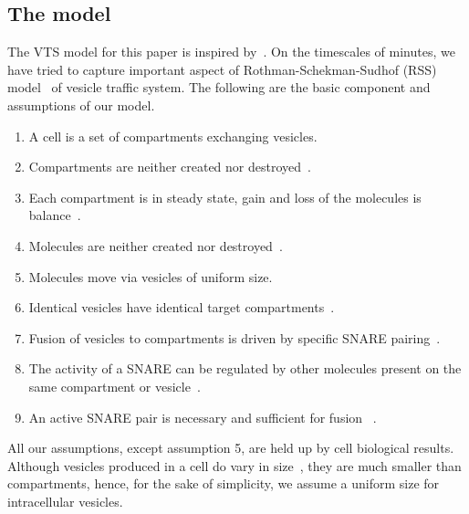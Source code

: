 \subsection{The model}
\noindent The VTS model for this paper is inspired by~\cite{shukla2017discovering}. 
%
On the timescales of minutes, we have tried to capture important aspect of Rothman-Schekman-Sudhof (RSS) model~\cite{rothman2002machinery} of vesicle traffic system.
%
The following are the basic component and assumptions of our model. 
\begin{enumerate}
\item A cell is a set of compartments exchanging vesicles.
\item Compartments are neither created nor destroyed~\cite{braell1984glycoprotein}.
\item Each compartment is in steady state, gain and loss of the molecules is balance~\cite{braell1984glycoprotein}.
\item Molecules are neither created nor destroyed~\cite{he2009differential}.
\item Molecules move via vesicles of uniform size.
\item Identical vesicles have identical target compartments~\cite{fries1981transient}.
\item Fusion of vesicles to compartments is driven by specific SNARE pairing~\cite{mcnew2000compartmental}.
\item The activity of a SNARE can be regulated by other molecules present on the same compartment or vesicle~\cite{mima2008reconstituted}.
\item An active SNARE pair is necessary and sufficient for fusion~\cite{weber1998snarepins}
. 
\end{enumerate}
%
All our assumptions, except assumption 5, are held up by cell biological results.
%
Although vesicles produced in a cell do vary in size~\cite{jena2008intracellular}, they are much smaller than compartments, hence, for the sake of simplicity, we assume a uniform size for intracellular vesicles.

